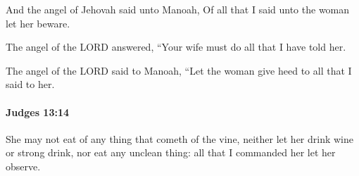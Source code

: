 			\begin{versebox}
					\item[BHS] 
					\item[ASV] And the angel of Jehovah said unto Manoah, Of all that I said unto the woman let her beware.
					\item[NIV] The angel of the LORD answered, “Your wife must do all that I have told her.
					\item[NRSV] The angel of the LORD said to Manoah, “Let the woman give heed to all that I said to her.
			\end{versebox}

		\paragraph{Judges 13:14} %
			\label{JUDGES-13-14}

			She may not eat of any thing that cometh of the vine, neither let her drink wine or strong drink, nor eat any unclean thing: all that I commanded her let her observe.

